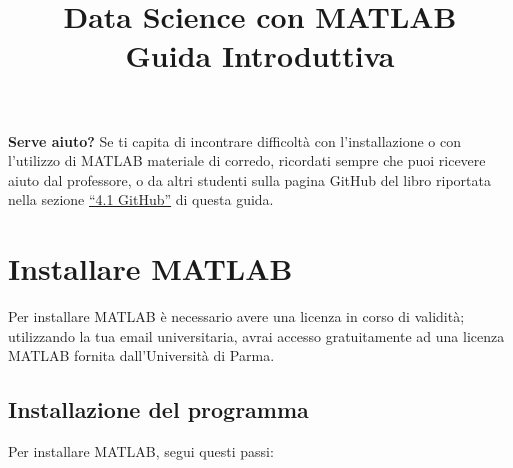 \documentclass[a4paper, 12pt]{article}
\title{Data Science con MATLAB\\
\large{Guida Introduttiva}}
\date{}
\author{}
\begin{document}
\maketitle %
\begin{center}
\begin{minipage}{0.95\textwidth}
\textbf{Serve aiuto?} \hfill \break
Se ti capita di incontrare difficoltà con l'installazione o con l'utilizzo di
MATLAB materiale di corredo, ricordati sempre che puoi ricevere aiuto dal
professore, o da altri studenti sulla pagina GitHub del libro riportata nella
sezione \hyperref[sec:GitHub]{\enquote{4.1 GitHub}} di questa guida.\hfill
\end{minipage}
\end{center}

\tableofcontents

\newpage


\section{Installare MATLAB}\label{sec:MATinstall} Per installare MATLAB è
necessario avere una licenza in corso di validità; utilizzando la tua email
universitaria, avrai accesso gratuitamente ad una licenza MATLAB fornita
dall'Università di Parma.

\subsection{Installazione del programma}
Per installare MATLAB, segui questi passi:
\end{document}
